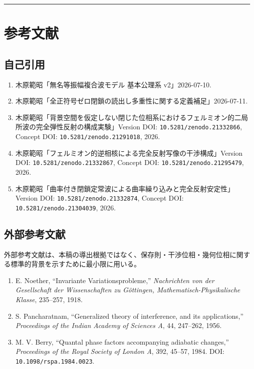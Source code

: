 \documentclass[
  a4paper,
]{article}
\providecommand{\tightlist}{%
  \setlength{\itemsep}{0pt}\setlength{\parskip}{0pt}}
\begin{document}
\begin{center}\rule{0.5\linewidth}{0.5pt}\end{center}

\section{参考文献}\label{ux53c2ux8003ux6587ux732e}

\subsection{自己引用}\label{ux81eaux5df1ux5f15ux7528}

\begin{enumerate}
\def\labelenumi{\arabic{enumi}.}
\tightlist
\item
  木原範昭「無名等振幅複合波モデル 基本公理系 v2」2026-07-10.
\item
  木原範昭「全正符号ゼロ閉鎖の読出し多重性に関する定義補足」2026-07-11.
\item
  木原範昭「背景空間を仮定しない閉じた位相系におけるフェルミオン的二局所波の完全弾性反射の構成実験」Version
  DOI: \texttt{10.5281/zenodo.21332866}, Concept DOI:
  \texttt{10.5281/zenodo.21291018}, 2026.
\item
  木原範昭「フェルミオン的逆相核による完全反射写像の干渉構成」Version
  DOI: \texttt{10.5281/zenodo.21332867}, Concept DOI:
  \texttt{10.5281/zenodo.21295479}, 2026.
\item
  木原範昭「曲率付き閉鎖定常波による曲率繰り込みと完全反射安定性」Version
  DOI: \texttt{10.5281/zenodo.21332874}, Concept DOI:
  \texttt{10.5281/zenodo.21304039}, 2026.
\end{enumerate}

\subsection{外部参考文献}\label{ux5916ux90e8ux53c2ux8003ux6587ux732e}

外部参考文献は、本稿の導出根拠ではなく、保存則・干渉位相・幾何位相に関する標準的背景を示すために最小限に用いる。

\begin{enumerate}
\def\labelenumi{\arabic{enumi}.}
\setcounter{enumi}{5}
\tightlist
\item
  E. Noether, ``Invariante Variationsprobleme,'' \emph{Nachrichten von
  der Gesellschaft der Wissenschaften zu Göttingen,
  Mathematisch-Physikalische Klasse}, 235--257, 1918.
\item
  S. Pancharatnam, ``Generalized theory of interference, and its
  applications,'' \emph{Proceedings of the Indian Academy of Sciences
  A}, 44, 247--262, 1956.
\item
  M. V. Berry, ``Quantal phase factors accompanying adiabatic changes,''
  \emph{Proceedings of the Royal Society of London A}, 392, 45--57,
  1984. DOI: \texttt{10.1098/rspa.1984.0023}.
\end{enumerate}
\end{document}
